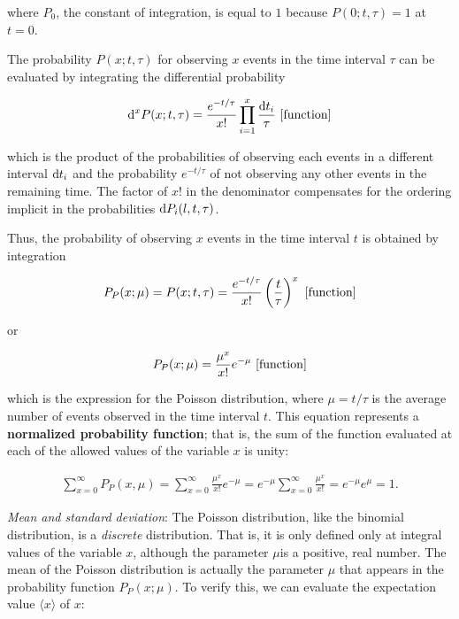 \documentclass[a4paper,10pt]{article}
\begin{document}
{\noindent}where $P_0$, the constant of integration, is equal to $1$ because $P(0;t,\tau)=1$ at $t=0$.

{\noindent}The probability $P(x;t,\tau)$ for observing $x$ events in the time interval $\tau$ can be evaluated by integrating the differential probability

\begin{align*}
    {\rm d}^xP(x;t,\tau) = \frac{e^{-t/\tau}}{x!} \prod_{i=1}^x \frac{{\rm d}t_i}{\tau} ~ [{\rm function}]
\end{align*}

{\noindent}which is the product of the probabilities of observing each events in a different interval ${\rm d}t_i$ and the probability $e^{-t/\tau}$ of not observing any other events in the remaining time. The factor of $x!$ in the denominator compensates for the ordering implicit in the probabilities ${\rm d}P_i(l,t,\tau)$.

{\noindent}Thus, the probability of observing $x$ events in the time interval $t$ is obtained by integration

\begin{align*}
    P_P(x;\mu) = P(x;t,\tau) = \frac{e^{-t/\tau}}{x!} \left(\frac{t}{\tau}\right)^x ~ [{\rm function}]
\end{align*}

{\noindent}or

\begin{align*}
    P_P(x;\mu) = \frac{\mu^x}{x!} e^{-\mu} ~ [{\rm function}]
\end{align*}

{\noindent}which is the expression for the Poisson distribution, where $\mu=t/\tau$ is the average number of events observed in the time interval $t$. This equation represents a \textbf{normalized probability function}; that is, the sum of the function evaluated at each of the allowed values of the variable $x$ is unity:

\begin{align*}
    \sum_{x=0}^\infty P_P(x,\mu) = \sum_{x=0}^\infty \frac{\mu^x}{x!} e^{-\mu} = e^{-\mu} \sum_{x=0}^\infty \frac{\mu^x}{x!} = e^{-\mu}e^{\mu} = 1.
\end{align*}

{\noindent}\textit{Mean and standard deviation}: The Poisson distribution, like the binomial distribution, is a \textit{discrete} distribution. That is, it is only defined only at integral values of the variable $x$, although the parameter $\mu$is a positive, real number. The mean of the Poisson distribution is actually the parameter $\mu$ that appears in the probability function $P_P(x;\mu)$. To verify this, we can evaluate the expectation value $\langle x\rangle$ of $x$: 
\end{document}
